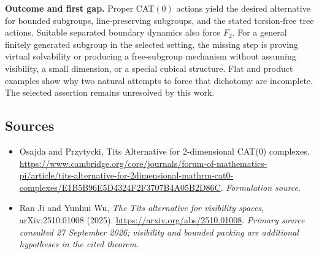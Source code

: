 \documentclass[11pt]{article}
\begin{document}
\textbf{Outcome and first gap.} Proper CAT$(0)$ actions yield the desired alternative for bounded subgroups, line-preserving subgroups, and the stated torsion-free tree actions. Suitable separated boundary dynamics also force $F_2$. For a general finitely generated subgroup in the selected setting, the missing step is proving virtual solvability or producing a free-subgroup mechanism without assuming visibility, a small dimension, or a special cubical structure. Flat and product examples show why two natural attempts to force that dichotomy are incomplete. The selected assertion remains unresolved by this work.

\subsection{Sources}
\begin{itemize}
\item[S1]Osajda and Przytycki, Tits Alternative for 2-dimensional CAT(0) complexes.
\url{https://www.cambridge.org/core/journals/forum-of-mathematics-pi/article/tits-alternative-for-2dimensional-mathrm-cat0-complexes/E1B5B96E5D4324F2F3707B4A05B2D86C}.
\textit{Formulation source.}
\item[E1]Ran Ji and Yunhui Wu, \emph{The Tits alternative for visibility spaces}, arXiv:2510.01008 (2025).
\url{https://arxiv.org/abs/2510.01008}.
\textit{Primary source consulted 27 September 2026; visibility and bounded packing are additional hypotheses in the cited theorem.}
\end{itemize}
\end{document}
